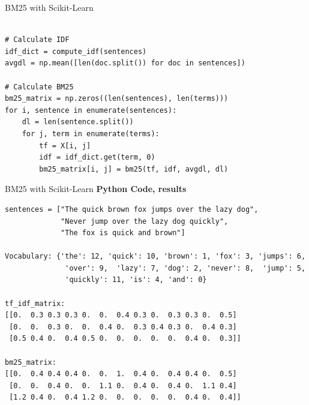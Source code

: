 \documentclass{beamer}
\begin{document}
\begin{frame}[fragile]{BM25 with Scikit-Learn}
\small
\begin{tcolorbox}[colback=lightgray, colframe=lightgray,
                  boxsep=0mm, arc=1mm, boxrule=0mm,
                  left=1mm, right=1mm, top=1mm, bottom=1mm]
\begin{Verbatim}[fontsize=\scriptsize, bgcolor=lightgray]

# Calculate IDF
idf_dict = compute_idf(sentences)
avgdl = np.mean([len(doc.split()) for doc in sentences])

# Calculate BM25
bm25_matrix = np.zeros((len(sentences), len(terms)))
for i, sentence in enumerate(sentences):
    dl = len(sentence.split())
    for j, term in enumerate(terms):
        tf = X[i, j]
        idf = idf_dict.get(term, 0)
        bm25_matrix[i, j] = bm25(tf, idf, avgdl, dl)

\end{Verbatim}
\end{tcolorbox}

\end{frame}

\begin{frame}[fragile]{BM25 with Scikit-Learn}
\small
\textbf{Python Code, results}
\begin{tcolorbox}[colback=lightgray, colframe=lightgray,
                  boxsep=0mm, arc=1mm, boxrule=0mm,
                  left=1mm, right=1mm, top=1mm, bottom=1mm]
\begin{Verbatim}[fontsize=\scriptsize, bgcolor=lightgray]
sentences = ["The quick brown fox jumps over the lazy dog",
             "Never jump over the lazy dog quickly",
             "The fox is quick and brown"]

Vocabulary: {'the': 12, 'quick': 10, 'brown': 1, 'fox': 3, 'jumps': 6,
              'over': 9,  'lazy': 7, 'dog': 2, 'never': 8,  'jump': 5,
              'quickly': 11, 'is': 4, 'and': 0}

tf_idf_matrix:
[[0.  0.3 0.3 0.3 0.  0.  0.4 0.3 0.  0.3 0.3 0.  0.5]
 [0.  0.  0.3 0.  0.  0.4 0.  0.3 0.4 0.3 0.  0.4 0.3]
 [0.5 0.4 0.  0.4 0.5 0.  0.  0.  0.  0.  0.4 0.  0.3]]

bm25_matrix:
[[0.  0.4 0.4 0.4 0.  0.  1.  0.4 0.  0.4 0.4 0.  0.5]
 [0.  0.  0.4 0.  0.  1.1 0.  0.4 0.  0.4 0.  1.1 0.4]
 [1.2 0.4 0.  0.4 1.2 0.  0.  0.  0.  0.  0.4 0.  0.4]]
\end{Verbatim}
\end{tcolorbox}
\end{frame}
\end{document}
